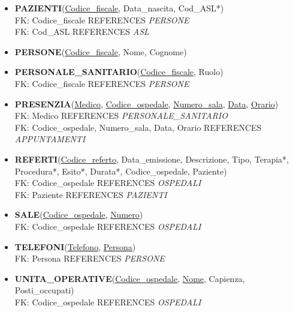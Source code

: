 \documentclass[a4paper,12pt]{report}
\begin{document}
\begin{itemize}
  \item \textbf{PAZIENTI}(\underline{Codice\_fiscale}, Data\_nascita, Cod\_ASL*)
  \\ FK: Codice\_fiscale REFERENCES \emph{PERSONE}
  \\ FK: Cod\_ASL REFERENCES \emph{ASL}
  \item \textbf{PERSONE}(\underline{Codice\_fiscale}, Nome, Cognome)
  \item \textbf{PERSONALE\_SANITARIO}(\underline{Codice\_fiscale}, Ruolo)
  \\ FK: Codice\_fiscale REFERENCES \emph{PERSONE}
  \item \textbf{PRESENZIA}(\underline{Medico}, \underline{Codice\_ospedale}, \underline{Numero\_sala}, \underline{Data}, \underline{Orario})
  \\ FK: Medico REFERENCES \emph{PERSONALE\_SANITARIO}
  \\ FK: Codice\_ospedale, Numero\_sala, Data, Orario REFERENCES \emph{APPUNTAMENTI}
  \item \textbf{REFERTI}(\underline{Codice\_referto}, Data\_emissione, Descrizione, Tipo, Terapia*, Procedura*, Esito*, Durata*, Codice\_ospedale, Paziente)
  \\ FK: Codice\_ospedale REFERENCES \emph{OSPEDALI}
  \\ FK: Paziente REFERENCES \emph{PAZIENTI}
  \item \textbf{SALE}(\underline{Codice\_ospedale}, \underline{Numero})
  \\ FK: Codice\_ospedale REFERENCES \emph{OSPEDALI}
  \item \textbf{TELEFONI}(\underline{Telefono}, \underline{Persona})
  \\ FK: Persona REFERENCES \emph{PERSONE}
  \item \textbf{UNITA\_OPERATIVE}(\underline{Codice\_ospedale}, \underline{Nome}, Capienza, Posti\_occupati)
  \\ FK: Codice\_ospedale REFERENCES \emph{OSPEDALI}
\end{itemize}
\end{document}
